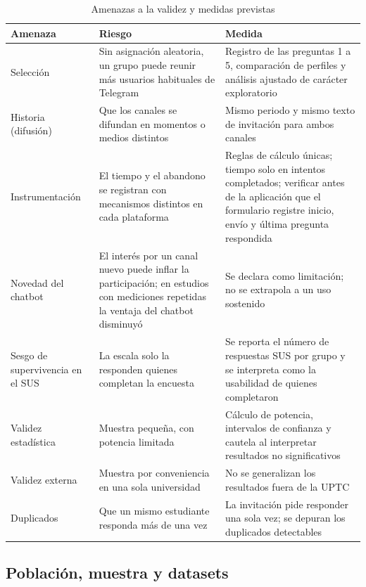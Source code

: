 \documentclass[12pt,letterpaper]{article}
\begin{document}
\begin{table}[htbp]
\centering
\caption{Amenazas a la validez y medidas previstas}
\label{tab:amenazas}
\small
\begin{tabular}{|p{3.1cm}|p{4.4cm}|p{5.2cm}|}
\hline
\textbf{Amenaza} & \textbf{Riesgo} & \textbf{Medida} \\ \hline
Selección & Sin asignación aleatoria, un grupo puede reunir más usuarios habituales de Telegram & Registro de las preguntas 1 a 5, comparación de perfiles y análisis ajustado de carácter exploratorio \\ \hline
Historia (difusión) & Que los canales se difundan en momentos o medios distintos & Mismo periodo y mismo texto de invitación para ambos canales \\ \hline
Instrumentación & El tiempo y el abandono se registran con mecanismos distintos en cada plataforma & Reglas de cálculo únicas; tiempo solo en intentos completados; verificar antes de la aplicación que el formulario registre inicio, envío y última pregunta respondida \\ \hline
Novedad del chatbot & El interés por un canal nuevo puede inflar la participación; en estudios con mediciones repetidas la ventaja del chatbot disminuyó \cite{zarouali2023} & Se declara como limitación; no se extrapola a un uso sostenido \\ \hline
Sesgo de supervivencia en el SUS & La escala solo la responden quienes completan la encuesta & Se reporta el número de respuestas SUS por grupo y se interpreta como la usabilidad de quienes completaron \\ \hline
Validez estadística & Muestra pequeña, con potencia limitada & Cálculo de potencia, intervalos de confianza y cautela al interpretar resultados no significativos \\ \hline
Validez externa & Muestra por conveniencia en una sola universidad & No se generalizan los resultados fuera de la UPTC \\ \hline
Duplicados & Que un mismo estudiante responda más de una vez & La invitación pide responder una sola vez; se depuran los duplicados detectables \\ \hline
\end{tabular}
\end{table}

\subsection{Población, muestra y datasets}
\end{document}
